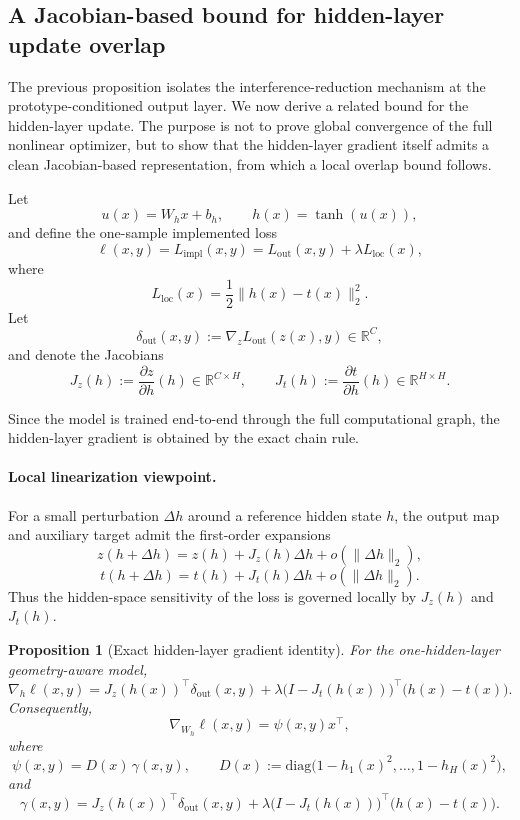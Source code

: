 \documentclass{article}
\newtheorem{prop}[thm]{Proposition}
\theoremstyle{definition}
\theoremstyle{remark}
\begin{document}
\subsection{A Jacobian-based bound for hidden-layer update overlap}
\label{subsec:hidden_jacobian_bound}

The previous proposition isolates the interference-reduction mechanism at the
prototype-conditioned output layer. We now derive a related bound for the
hidden-layer update. The purpose is not to prove global convergence of the full
nonlinear optimizer, but to show that the hidden-layer gradient itself admits a
clean Jacobian-based representation, from which a local overlap bound follows.

Let
\[
u(x)=W_hx+b_h, \qquad h(x)=\tanh(u(x)),
\]
and define the one-sample implemented loss
\[
\ell(x,y)=L_{\mathrm{impl}}(x,y)
= L_{\mathrm{out}}(x,y)+\lambda L_{\mathrm{loc}}(x),
\]
where
\[
L_{\mathrm{loc}}(x)=\frac{1}{2}\|h(x)-t(x)\|_2^2.
\]
Let
\[
\delta_{\mathrm{out}}(x,y)
:=\nabla_z L_{\mathrm{out}}(z(x),y)\in\mathbb{R}^C,
\]
and denote the Jacobians
\[
J_z(h):=\frac{\partial z}{\partial h}(h)\in\mathbb{R}^{C\times H},
\qquad
J_t(h):=\frac{\partial t}{\partial h}(h)\in\mathbb{R}^{H\times H}.
\]

Since the model is trained end-to-end through the full computational graph,
the hidden-layer gradient is obtained by the exact chain rule.

\paragraph{Local linearization viewpoint.}
For a small perturbation \(\Delta h\) around a reference hidden state \(h\),
the output map and auxiliary target admit the first-order expansions
\[
z(h+\Delta h)=z(h)+J_z(h)\Delta h + o(\|\Delta h\|_2),
\]
\[
t(h+\Delta h)=t(h)+J_t(h)\Delta h + o(\|\Delta h\|_2).
\]
Thus the hidden-space sensitivity of the loss is governed locally by
\(J_z(h)\) and \(J_t(h)\).

\begin{prop}[Exact hidden-layer gradient identity]
\label{prop:hidden_exact_gradient}
For the one-hidden-layer geometry-aware model,
\[
\nabla_h \ell(x,y)
=
J_z(h(x))^\top \delta_{\mathrm{out}}(x,y)
+
\lambda\bigl(I-J_t(h(x))\bigr)^\top \bigl(h(x)-t(x)\bigr).
\]
Consequently,
\[
\nabla_{W_h}\ell(x,y)=\psi(x,y)x^\top,
\]
where
\[
\psi(x,y)
=
D(x)\,\gamma(x,y),
\qquad
D(x):=\mathrm{diag}\bigl(1-h_1(x)^2,\dots,1-h_H(x)^2\bigr),
\]
and
\[
\gamma(x,y)
=
J_z(h(x))^\top \delta_{\mathrm{out}}(x,y)
+
\lambda\bigl(I-J_t(h(x))\bigr)^\top \bigl(h(x)-t(x)\bigr).
\]
\end{prop}
\end{document}
